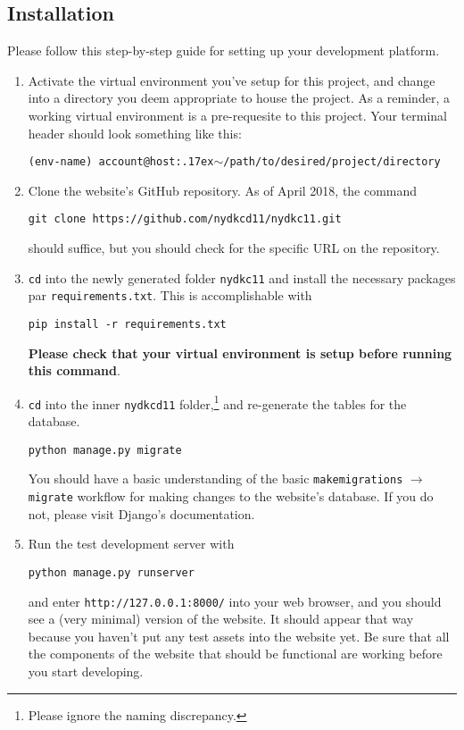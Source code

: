 \documentclass[hidelinks]{article}
\newcommand{\snippet}[1]{{\centering\texttt{#1}\par}}
\newcommand{\tilda}{{\raise.17ex\hbox{$\scriptstyle\mathtt{\sim}$}}}
\begin{document}
\subsection{Installation}

Please follow this step-by-step guide for setting up your development platform.

\begin{enumerate}
\item Activate the virtual environment you've setup for this project, and change into a directory you deem appropriate to house the project.
As a reminder, a working virtual environment is a pre-requesite to this project. 
Your terminal header should look something like this:

\snippet{(env-name) account@host:\tilda{}/path/to/desired/project/directory}

\item Clone the website's GitHub repository. As of April 2018, the command

\snippet{git clone https://github.com/nydkcd11/nydkc11.git}

should suffice, but you should check for the specific URL on the repository. 

\item \texttt{cd} into the newly generated folder \texttt{nydkc11} and install the necessary packages par \texttt{requirements.txt}. 
This is accomplishable with

\snippet{pip install -r requirements.txt}

\textbf{Please check that your virtual environment is setup before running this command}.

\item \texttt{cd} into the inner \texttt{nydkcd11} folder,\footnote{Please ignore the naming discrepancy.} and re-generate the tables for the database. 

\snippet{python manage.py migrate}

You should have a basic understanding of the basic \texttt{makemigrations} $\to$ \texttt{migrate} workflow for making changes to the website's database.
If you do not, please visit Django's documentation.

\item Run the test development server with 

\snippet{python manage.py runserver}

and enter \texttt{http://127.0.0.1:8000/} into your web browser, and you should see a (very minimal) version of the website.
It should appear that way because you haven't put any test assets into the website yet.
Be sure that all the components of the website that should be functional are working before you start developing.

\end{enumerate}
\end{document}
